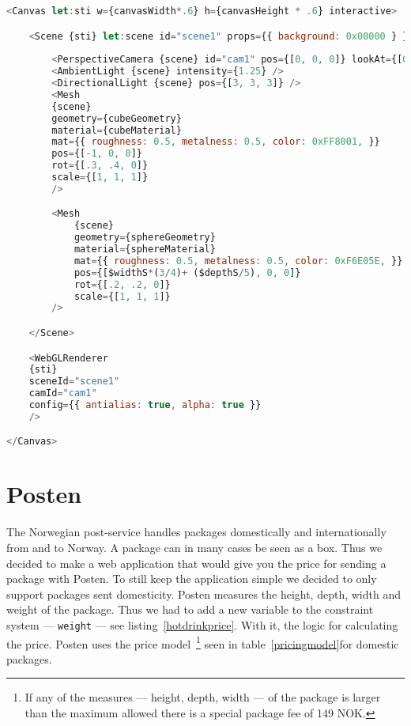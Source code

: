\begin{lstlisting}[caption={Example of a SveltThree setup},label=sveltthreesetup, language=javascript]
<Canvas let:sti w={canvasWidth*.6} h={canvasHeight * .6} interactive>

    <Scene {sti} let:scene id="scene1" props={{ background: 0x00000 } } >
        
        <PerspectiveCamera {scene} id="cam1" pos={[0, 0, 0]} lookAt={[0, 0, 0]} />
        <AmbientLight {scene} intensity={1.25} />
        <DirectionalLight {scene} pos={[3, 3, 3]} />
        <Mesh
        {scene}
        geometry={cubeGeometry}
        material={cubeMaterial}
        mat={{ roughness: 0.5, metalness: 0.5, color: 0xFF8001, }}
        pos={[-1, 0, 0]}
        rot={[.3, .4, 0]}
        scale={[1, 1, 1]} 
        />

        <Mesh
            {scene}
            geometry={sphereGeometry}
            material={sphereMaterial}
            mat={{ roughness: 0.5, metalness: 0.5, color: 0xF6E05E, }}
            pos={[$widthS*(3/4)+ ($depthS/5), 0, 0]}
            rot={[.2, .2, 0]}
            scale={[1, 1, 1]} 
        />

    </Scene>

    <WebGLRenderer
    {sti}
    sceneId="scene1"
    camId="cam1"
    config={{ antialias: true, alpha: true }} 
    />

</Canvas>
\end{lstlisting}

\section{Posten}
The Norwegian post-service handles packages domestically and internationally from 
and to Norway. 
A package can in many cases be seen as a box. Thus we decided to make a web application 
that would give you the price for sending a package with Posten. To still keep the 
application simple we decided to only support packages sent domesticity. Posten 
measures the height, depth, width and weight of the package. Thus we had to add a new 
variable to the constraint system --- \texttt{weight} --- see listing~\ref{hotdrinkprice}. 
With it, the logic for calculating the price. Posten uses the price
model~\cite{postenNorgespakken}\footnote{If any of the measures --- height, depth, width --- of the package is larger than the maximum allowed there is a special package fee of 149 NOK.} 
seen in table~\ref{pricingmodel}for domestic packages.

